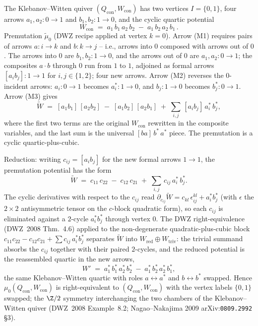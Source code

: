 \begin{example}
\label{ex:conifold-seiberg-duality}
The Klebanov--Witten quiver
$(Q_{\mathrm{con}}, W_{\mathrm{con}})$ has two vertices
$I = \{0, 1\}$, four arrows $a_1, a_2 \colon 0 \to 1$ and $b_1, b_2 \colon 1
\to 0$, and the cyclic quartic potential
\[
 W_{\mathrm{con}} \;=\; a_1\, b_1\, a_2\, b_2 \;-\; a_1\, b_2\, a_2\, b_1 \,.
\]
Premutation $\tilde\mu_0$ (DWZ recipe applied at vertex $k = 0$). Arrow
(M1) requires pairs of arrows $a \colon i \to k$ and $b \colon k \to j$
-- i.e., arrows into $0$ composed with arrows out of $0$. The arrows into
$0$ are $b_1, b_2 \colon 1 \to 0$, and the arrows out of $0$ are $a_1,
a_2 \colon 0 \to 1$; the composites $a \cdot b$ through $0$ run from
$1$ to $1$, adjoined as formal arrows $[a_i b_j] \colon 1 \to 1$ for
$i, j \in \{1, 2\}$; four new arrows.
Arrow (M2) reverses the $0$-incident arrows: $a_i \colon 0 \to 1$ becomes
$a_i^* \colon 1 \to 0$, and $b_j \colon 1 \to 0$ becomes $b_j^* \colon 0
\to 1$. Arrow (M3) gives
\[
 \tilde W \;=\; [a_1 b_1]\,[a_2 b_2] \;-\; [a_1 b_2]\,[a_2 b_1]
 \;+\; \sum_{i, j}\, [a_i b_j]\, a_i^{*}\, b_j^{*},
\]
where the first two terms are the original $W_{\mathrm{con}}$ rewritten
in the composite variables, and the last sum is the universal $[ba]\, b^*\,
a^*$ piece. The premutation is a cyclic quartic-plus-cubic.

Reduction: writing $c_{ij} = [a_i b_j]$ for the new formal arrows
$1 \to 1$, the premutation potential has the form
\[
 \tilde W \;=\; c_{11}\, c_{22} \;-\; c_{12}\, c_{21}
 \;+\; \sum_{i, j}\, c_{ij}\, a_i^{*}\, b_j^{*}.
\]
The cyclic derivatives with respect to the $c_{ij}$ read
$\partial_{c_{ij}} \tilde W = c_{kl} \,\epsilon^{kl}_{ij} + a_i^* b_j^*$
(with $\epsilon$ the $2 \times 2$ antisymmetric tensor on the $c$-block
quadratic form), so each $c_{ij}$ is eliminated against a $2$-cycle
$a_i^* b_j^*$ through vertex $0$. The DWZ right-equivalence (DWZ~2008
Thm.~4.6) applied to the non-degenerate quadratic-plus-cubic block
$c_{11}c_{22} - c_{12}c_{21} + \sum c_{ij}\, a_i^* b_j^*$ separates
$\tilde W$ into $W_{\mathrm{red}} \oplus W_{\mathrm{triv}}$: the trivial
summand absorbs the $c_{ij}$ together with their paired $2$-cycles, and
the reduced potential is the reassembled quartic in the new arrows,
\[
 W' \;=\; a_1^*\, b_1^*\, a_2^*\, b_2^* \;-\; a_1^*\, b_2^*\, a_2^*\, b_1^*,
\]
the same Klebanov--Witten quartic with roles $a \leftrightarrow a^*$ and
$b \leftrightarrow b^*$ swapped. Hence $\mu_0(Q_{\mathrm{con}},
W_{\mathrm{con}})$ is right-equivalent to $(Q_{\mathrm{con}},
W_{\mathrm{con}})$ with the vertex labels $\{0, 1\}$ swapped; the
$\Z/2$ symmetry interchanging the two chambers of the Klebanov--Witten
quiver (DWZ~2008 Example~8.2; Nagao--Nakajima 2009
arXiv:\texttt{0809.2992} \S3).


\end{example}
